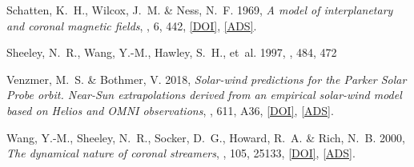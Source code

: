 	{Schatten}, K.~H., {Wilcox}, J.~M. \& {Ness}, N.~F. 1969, \emph{{A model of
	interplanetary and coronal magnetic fields}}, \solphys, 6, 442,
	\href{http://dx.doi.org/10.1007/BF00146478}{[DOI]},
	\href{http://adsabs.harvard.edu/abs/1969SoPh....6..442S}{[ADS]}.

	{Sheeley}, N.~R., {Wang}, Y.-M., {Hawley}, S.~H., {et~al.} 1997, \apj, 484, 472

	{Venzmer}, M.~S. \& {Bothmer}, V. 2018, \emph{{Solar-wind predictions for the
	Parker Solar Probe orbit. Near-Sun extrapolations derived from an empirical
	solar-wind model based on Helios and OMNI observations}}, \aap, 611, A36,
	\href{http://dx.doi.org/10.1051/0004-6361/201731831}{[DOI]},
	\href{http://adsabs.harvard.edu/abs/2018A\%26A...611A..36V}{[ADS]}.

	{Wang}, Y.-M., {Sheeley}, N.~R., {Socker}, D.~G., {Howard}, R.~A. \& {Rich},
	N.~B. 2000, \emph{{The dynamical nature of coronal streamers}}, \jgr, 105,
	25133, \href{http://dx.doi.org/10.1029/2000JA000149}{[DOI]},
	\href{http://adsabs.harvard.edu/abs/2000JGR...10525133W}{[ADS]}.

